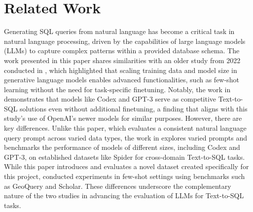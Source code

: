 \section{Related Work}


Generating SQL queries from natural language has become a critical task in natural language processing, driven by the capabilities of large language models (LLMs) to capture complex patterns within a provided database schema. The work presented in this paper shares similarities with an older study from 2022 conducted in \cite{rajkumar2022texttosql}, which highlighted that scaling training data and model size in generative language models enables advanced functionalities, such as few-shot learning without the need for task-specific finetuning. Notably, the work in \cite{rajkumar2022texttosql} demonstrates that models like Codex and GPT-3 serve as competitive Text-to-SQL solutions even without additional finetuning, a finding that aligns with this study's use of OpenAI's newer models for similar purposes. However, there are key differences. Unlike this paper, which evaluates a consistent natural language query prompt across varied data types, the work in \cite{rajkumar2022texttosql} explores varied prompts and benchmarks the performance of models of different sizes, including Codex and GPT-3, on established datasets like Spider for cross-domain Text-to-SQL tasks. While this paper introduces and evaluates a novel dataset created specifically for this project, \cite{rajkumar2022texttosql} conducted experiments in few-shot settings using benchmarks such as GeoQuery and Scholar. These differences underscore the complementary nature of the two studies in advancing the evaluation of LLMs for Text-to-SQL tasks.

